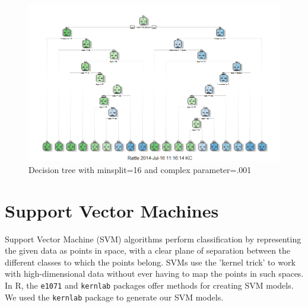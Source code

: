 \documentclass[a4paper,10pt]{report}\usepackage[]{graphicx}\usepackage[]{color}
\begin{document}
\begin{figure}[h]
  \includegraphics[width=\textwidth]{dt3}
  \caption{Decision tree with minsplit=16 and complex parameter=.001} \label{dt3}
\end{figure}
\section{Support Vector Machines}

Support Vector Machine (SVM) algorithms perform classification by representing the given data as points in space, with a clear plane of separation between the different classes to which the points belong. SVMs use the 'kernel trick' to work with high-dimensional data without ever having to map the points in such spaces. 
In R, the \texttt{e1071} and \texttt{kernlab} packages offer methods for creating SVM models. We used the \texttt{kernlab} package to generate our SVM models.
\end{document}
